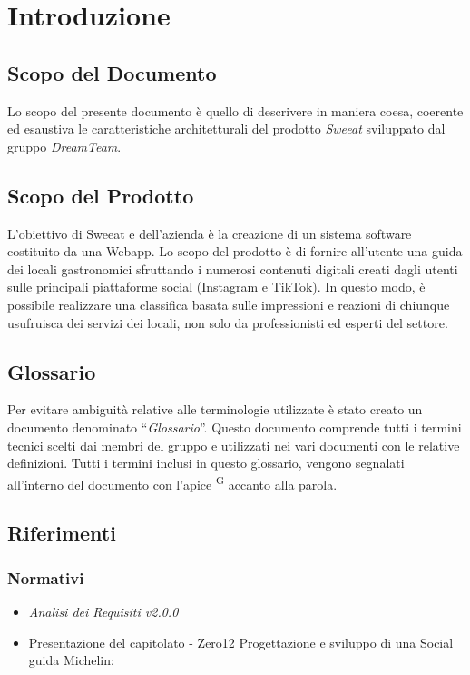 \section{Introduzione}

\subsection{Scopo del Documento}
Lo scopo del presente documento è quello di descrivere in maniera coesa, coerente ed esaustiva le caratteristiche architetturali del prodotto \textit{Sweeat} sviluppato dal gruppo \textit{DreamTeam}.


\subsection{Scopo del Prodotto}
L’obiettivo di Sweeat e dell’azienda \zd è la creazione di un sistema software costituito da una Webapp. Lo scopo del prodotto è di fornire all’utente una guida dei locali gastronomici sfruttando i numerosi contenuti digitali creati dagli utenti sulle principali piattaforme social (Instagram e TikTok).
In questo modo, è possibile realizzare una classifica basata sulle impressioni e reazioni di chiunque usufruisca dei servizi dei locali, non solo da professionisti ed esperti del settore.


\subsection{Glossario}
Per evitare ambiguità relative alle terminologie utilizzate è stato creato un documento denominato “\textit{Glossario}”. Questo documento comprende tutti i termini tecnici scelti dai membri del gruppo e utilizzati nei vari documenti con le relative definizioni. Tutti i termini inclusi in questo glossario, vengono segnalati all'interno del documento con l'apice \textsuperscript{G} accanto alla parola.

\subsection{Riferimenti}
\subsubsection{Normativi}
\begin{itemize}
\item \textit{Analisi dei Requisiti v2.0.0}
\item Presentazione del capitolato - Zero12 Progettazione e sviluppo di una Social guida Michelin:
\newline {}
\end{itemize}
